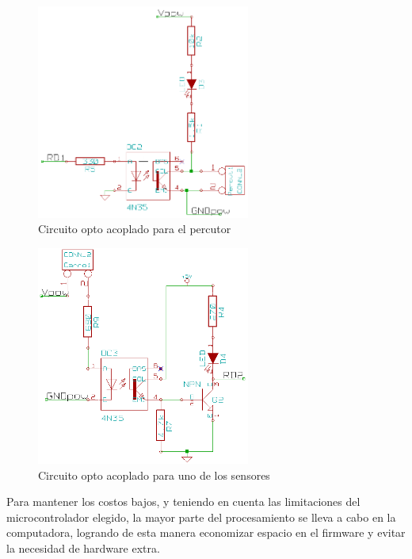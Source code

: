\begin{figure}[htp]
\centering
\includegraphics[width=7cm]{./img/opto_percutor.png}
\caption{Circuito opto acoplado para el percutor}
\label{fig:opto_percutor}
\end{figure}

\begin{figure}[htp]
\centering
\includegraphics[width=7cm]{./img/opto_sensor.png}
\caption{Circuito opto acoplado para uno de los sensores}
\label{fig:opto_sensor}
\end{figure}



Para mantener los costos bajos, y teniendo en cuenta las limitaciones del
microcontrolador elegido, la mayor parte del procesamiento se lleva a cabo
en la computadora, logrando de esta manera economizar espacio en el firmware y
evitar la necesidad de hardware extra.\\

